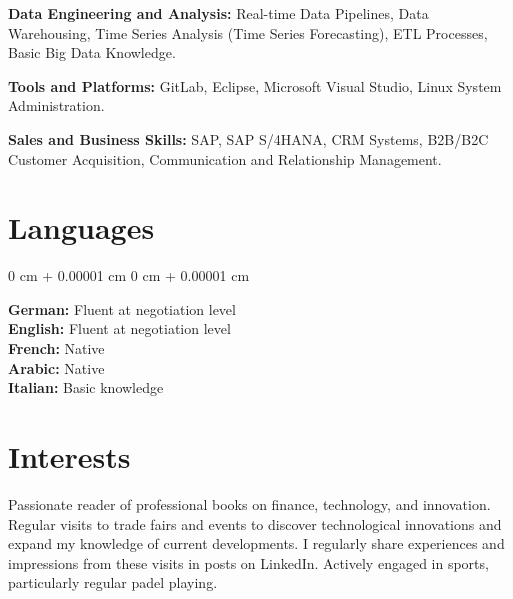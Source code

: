 \documentclass[10pt, letterpaper]{article}
\newenvironment{onecolentry}{
    \begin{adjustwidth}{
        0 cm + 0.00001 cm
    }{
        0 cm + 0.00001 cm
    }
}{
    \end{adjustwidth}
} %
\begin{document}
\textbf{Data Engineering and Analysis:}  
Real-time Data Pipelines, Data Warehousing, Time Series Analysis (Time Series Forecasting), ETL Processes, Basic Big Data Knowledge.

\textbf{Tools and Platforms:}  
GitLab, Eclipse, Microsoft Visual Studio, Linux System Administration.

\textbf{Sales and Business Skills:}  
SAP, SAP S/4HANA, CRM Systems, B2B/B2C Customer Acquisition, Communication and Relationship Management.

\section{Languages}

\begin{onecolentry}
    \textbf{German:} Fluent at negotiation level \\
    \textbf{English:} Fluent at negotiation level \\
    \textbf{French:} Native \\
    \textbf{Arabic:} Native \\
    \textbf{Italian:} Basic knowledge
\end{onecolentry}

\section{Interests}

Passionate reader of professional books on finance, technology, and innovation.  
Regular visits to trade fairs and events to discover technological innovations and expand my knowledge of current developments.  
I regularly share experiences and impressions from these visits in posts on LinkedIn.  
Actively engaged in sports, particularly regular padel playing.
    
\end{document}

